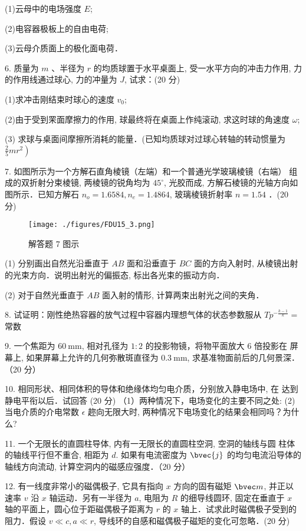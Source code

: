 (1)云母中的电场强度 $E$;

(2)电容器极板上的自由电荷;

(3)云母介质面上的极化面电荷．

6. 质量为 $m$ 、半径为 $r$ 的均质球置于水平桌面上, 受一水平方向的冲击力作用, 力的作用线通过球心, 力的冲量为 $J$, 试求：(20 分)

(1)求冲击刚结束时球心的速度 $v_{0}$;

(2)由于受到䍒面摩擦力的作用, 球最终将在桌面上作纯滚动, 求这时球的角速度 $\omega$;

(3) 求球与桌面间摩擦所消耗的能量．(已知均质球对过球心转轴的转动惯量为 $\left.\frac{2}{5} m r^{2}\right)$

7. 如图所示为一个方解石直角棱镜（左端）和一个普通光学玻璃棱镜（右端） 组成的双折射分束棱镜, 两棱镜的锐角均为 $45^{\circ}$, 光胶而成, 方解石棱镜的光轴方向如图所示．已知方解石 $n_{o}=1.6584, n_{e}=1.4864$, 玻璃棱镜折射率 $n=1.54$ ．(20 分)
\begin{figure}[ht]
\centering
\texttt{[image: ./figures/FDU15\_3.png]}
\caption{解答题 7 图示} \label{FDU15_fig3}
\end{figure}
(1) 分别画出自然光沿垂直于 $A B$ 面和沿垂直于 $B C$ 面的方向入射时, 从棱镜出射的光束方向．说明出射光的偏振态, 标出各光束的振动方向．

(2) 对于自然光垂直于 $A B$ 面入射的情形, 计算两束出射光之间的夹角．

8. 试证明：刚性绝热容器的放气过程中容器内理想气体的状态参数服从 $T p^{-\frac{k-1}{k}}=$ 常数

9. 一个焦距为 $60 \mathrm{~mm}$, 相对孔径为 $1: 2$ 的投影物镜，将物平面放大 $6$ 倍投影在 屏幕上, 如果屏幕上允许的几何弥散斑直径为 $0.3 \mathrm{~mm}$, 求基准物面前后的几何景深．
（20 分）

10. 相同形状、相同体积的导体和绝缘体均匀电介质，分别放入静电场中, 在 达到静电平衔以后．试回答
(20 分)
（1）两种情况下，电场变化的主要不同之处:
(2) 当电介质的介电常数 $\epsilon$ 趂向无限大时, 两种情况下电场变化的结果会相同吗？为什么?

11. 一个无限长的直圆柱导体, 内有一无限长的直圆柱空洞, 空洞的轴线与圆 柱体的轴线平行但不重合, 相距为 $d$. 如果有电流密度为 $\bvec{j}$ 的均匀电流沿导体的轴线方向流动, 计算空洞内的磁感应强度．（20 分）

12. 有一线度非常小的磁偶极子, 它具有指向 $x$ 方向的固有磁矩 $\bvec m$, 并正以速率 $v$ 沿 $x$ 轴运动．另有一半径为 $a$, 电阻为 $R$ 的细导线圆环, 固定在垂直于 $x$ 轴的平面上，圆心位于距磁偶极子距离为 $r$ 的 $x$ 轴上．试求此时磁偶极子受到的阻力．假设 $v \ll c, a \ll r$, 导线环的自感和磁偶极子磁矩的变化可忽略．(20 分)